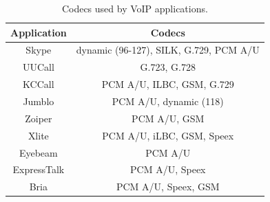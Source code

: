 \documentclass[conference]{IEEEtran}
\begin{document}
\begin{table}[htbp]
  \caption{Codecs used by VoIP applications.}
  \label{tab:codecs}
  \centering
  \begin{tabular}{c c}
    \hline
    \textbf{Application} & \textbf{Codecs}\\
    \hline
    Skype      & dynamic (96-127), SILK, G.729, PCM A/U  \\
    UUCall      & G.723, G.728  \\
    KCCall      & PCM A/U, ILBC, GSM, G.729  \\
    Jumblo      & PCM A/U, dynamic (118)  \\
    Zoiper      & PCM A/U, GSM  \\
    Xlite      &  PCM A/U, iLBC, GSM, Speex \\
    Eyebeam      & PCM A/U  \\
    ExpressTalk      & PCM A/U, Speex  \\
    Bria      & PCM A/U, Speex, GSM  \\
    \hline
  \end{tabular}
\end{table}


\end{document}
